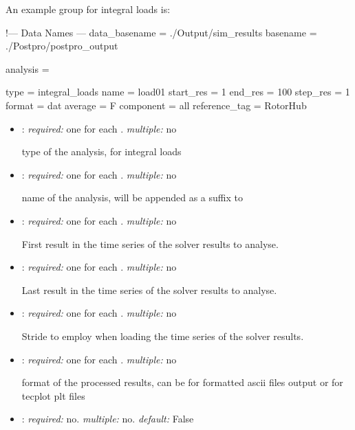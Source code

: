 An example  group for integral loads is:

\begin{inputfile}[frame=single, caption={dust\_post.in for integral loads}, 
  label={file:dust_post.in_load}]
!--- Data Names ---
data_basename = ./Output/sim_results
basename =     ./Postpro/postpro_output

analysis = {

type = integral_loads
name = load01
start_res = 1
end_res   = 100 
step_res  = 1
format = dat
average = F
component = all
reference_tag = RotorHub

}
\end{inputfile}

\begin{itemize}
\item {}: \textit{required:} one for each . \textit{multiple:} no

type of the analysis,  for integral loads

\item {}: \textit{required:} one for each . \textit{multiple:} no

name of the analysis, will be appended as a suffix to 

\item {}: \textit{required:} one for each . \textit{multiple:} no

First result in the time series of the solver results to analyse.

\item {}: \textit{required:} one for each . \textit{multiple:} no

Last result in the time series of the solver results to analyse.

\item {}: \textit{required:} one for each . \textit{multiple:} no

Stride to employ when loading the time series of the solver results. 

\item {}: \textit{required:} one for each . \textit{multiple:} no

format of the processed results, can be  for formatted ascii files output or 
 for tecplot plt files

\item {}: \textit{required:} no. \textit{multiple:} no. \textit{default:} False


\end{itemize}

